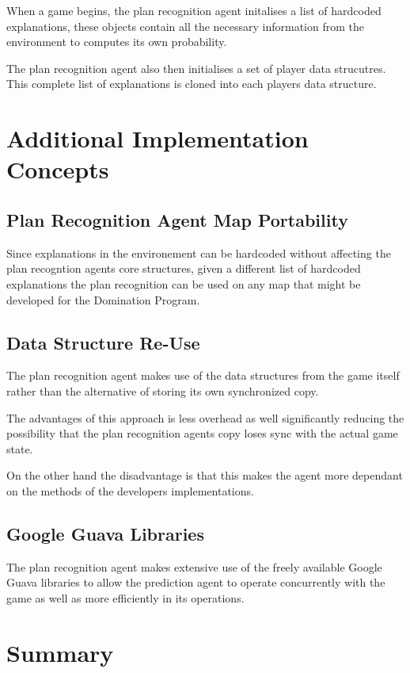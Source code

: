 \documentclass[parskip]{cs4rep}
\begin{document}
When a game begins, the plan recognition agent initalises a list of hardcoded explanations, these objects contain all the necessary information from the environment to computes its own probability.

The plan recognition agent also then initialises a set of player data strucutres. This complete list of explanations is cloned into each players data structure.

\section{Additional Implementation Concepts}

\subsection{Plan Recognition Agent Map Portability}

Since explanations in the environement can be hardcoded without affecting the plan recogntion agents core structures, given a different list of hardcoded explanations the plan recognition can be used on any map that might be developed for the Domination Program.

\subsection{Data Structure Re-Use}

The plan recognition agent makes use of the data structures from the game itself rather than the alternative of storing its own synchronized copy.

The advantages of this approach is less overhead as well significantly reducing the possibility that the plan recognition agents copy loses sync with the actual game state. 

On the other hand the disadvantage is that this makes the agent more dependant on the methods of the developers implementations.

\subsection{Google Guava Libraries}

The plan recognition agent makes extensive use of the freely available Google Guava libraries to allow the prediction agent to operate concurrently with the game as well as more efficiently in its operations.

\section{Summary}
\end{document}
